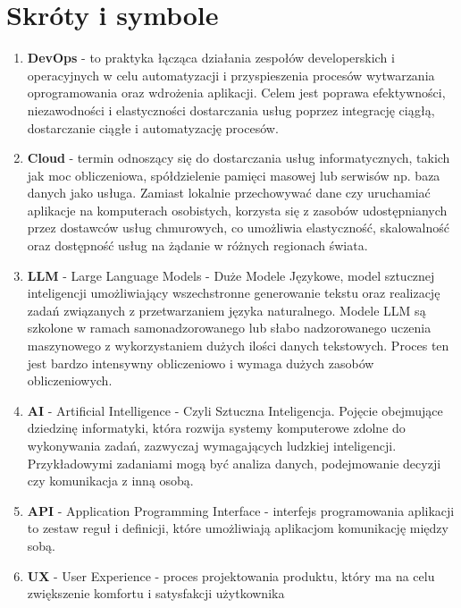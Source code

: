 \section{Skróty i symbole}

 \begin{enumerate}
    \item {\bf DevOps} - to praktyka łącząca działania zespołów developerskich i operacyjnych w celu automatyzacji i przyspieszenia procesów wytwarzania oprogramowania oraz wdrożenia aplikacji. Celem jest poprawa efektywności, niezawodności i elastyczności dostarczania usług poprzez integrację ciągłą, dostarczanie ciągłe i automatyzację procesów.
    
    \item {\bf Cloud} - termin odnoszący się do dostarczania usług informatycznych, takich jak moc obliczeniowa, spółdzielenie pamięci masowej lub serwisów np. baza danych jako usługa. Zamiast lokalnie przechowywać dane czy uruchamiać aplikacje na komputerach osobistych, korzysta się z zasobów udostępnianych przez dostawców usług chmurowych, co umożliwia elastyczność, skalowalność oraz dostępność usług na żądanie w różnych regionach świata.
    
    \item {\bf LLM} - Large Language Models - Duże Modele Językowe, model sztucznej inteligencji umożliwiający wszechstronne generowanie tekstu oraz realizację zadań związanych z przetwarzaniem języka naturalnego. Modele LLM są szkolone w ramach samonadzorowanego lub słabo nadzorowanego uczenia maszynowego z wykorzystaniem dużych ilości danych tekstowych. Proces ten jest bardzo intensywny obliczeniowo i wymaga dużych zasobów obliczeniowych.
    
    \item {\bf AI} - Artificial Intelligence - Czyli Sztuczna Inteligencja. Pojęcie obejmujące dziedzinę informatyki, która rozwija systemy komputerowe zdolne do wykonywania zadań, zazwyczaj wymagających ludzkiej inteligencji. Przykładowymi zadaniami mogą być analiza danych, podejmowanie decyzji czy komunikacja z inną osobą.
    
    \item {\bf API} - Application Programming Interface - interfejs programowania aplikacji to zestaw reguł i definicji, które umożliwiają aplikacjom komunikację między sobą.
    
    \item {\bf UX} - User Experience - proces projektowania produktu, który ma na celu zwiększenie komfortu i satysfakcji użytkownika
    

\end{enumerate}
